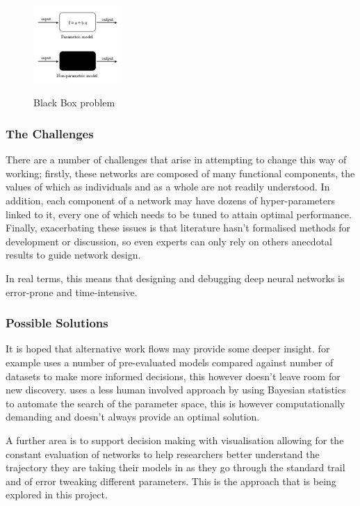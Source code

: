 \documentclass[a4paper,11pt,titlepage]{article}
\begin{document}
		\begin{figure}[H]
    			\centering	
			{{\includegraphics[width=0.3\textwidth]
    				{img/black_box.png} 
    			}}%
    			\caption{Black Box problem}%
    			\label{fig:BlackBox}
		\end{figure}	
		
		\subsubsection{The Challenges}
		There are a number of challenges that arise in attempting to change this way of working; firstly, these networks are composed of many functional components, the values of which as individuals and as a whole are not readily understood. In addition, each component of a network may have dozens of hyper-parameters linked to it, every one of which needs to be tuned to attain optimal performance. Finally, exacerbating these issues is that literature hasn't formalised methods for development or discussion, so even experts can only rely on others anecdotal results to guide network design.
		\par 
		In real terms, this means that designing and debugging deep neural networks is error-prone and time-intensive. 
		\par 
		\subsubsection{Possible Solutions}
		It is hoped that alternative work flows may provide some deeper insight. \cite{Jarrett2009} for example uses a number of pre-evaluated models compared against number of datasets to make more informed decisions, this however doesn't leave room for new discovery. \cite{Bergstra2013} uses a less human involved approach by using Bayesian statistics to automate the search of the parameter space, this is however computationally demanding and doesn't always provide an optimal solution. 
		\par 
		A further area is to support decision making with visualisation allowing for the constant evaluation of networks to help researchers better understand the trajectory they are taking their models in as they go through the standard trail and of error tweaking different parameters. This is the approach that is being explored in this project. 
		\par
\end{document}
